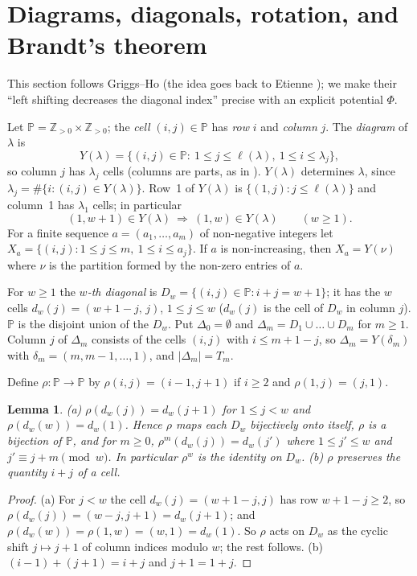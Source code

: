 \documentclass[11pt]{article}
\newtheorem{lemma}[theorem]{Lemma}
\theoremstyle{definition}
\newcommand{\Z}{\mathbb{Z}}
\newcommand{\PP}{\mathbb{P}}
\renewcommand{\le}{\leqslant}
\renewcommand{\ge}{\geqslant}
\begin{document}
\section{Diagrams, diagonals, rotation, and Brandt's theorem}\label{sec:brandt}

This section follows Griggs--Ho \cite[\S2]{GH} (the idea goes back to Etienne \cite{Et});
we make their ``left shifting decreases the diagonal index'' precise with an explicit
potential $\Phi$.

Let $\PP=\Z_{>0}\times\Z_{>0}$; the \emph{cell} $(i,j)\in\PP$ has \emph{row} $i$ and \emph{column} $j$.
The \emph{diagram} of $\lambda$ is
\[Y(\lambda)=\{(i,j)\in\PP:\ 1\le j\le\ell(\lambda),\ 1\le i\le\lambda_j\},\]
so column $j$ has $\lambda_j$ cells (columns are parts, as in \cite{GH}).
$Y(\lambda)$ determines $\lambda$, since $\lambda_j=\#\{i:(i,j)\in Y(\lambda)\}$.
Row~1 of $Y(\lambda)$ is $\{(1,j):j\le\ell(\lambda)\}$ and column~1 has $\lambda_1$ cells; in particular
\begin{equation}\label{eq:Y1}
(1,w+1)\in Y(\lambda)\ \Longrightarrow\ (1,w)\in Y(\lambda)\qquad(w\ge1).
\end{equation}
For a finite sequence $a=(a_1,\dots,a_m)$ of non-negative integers let
$X_a=\{(i,j):1\le j\le m,\ 1\le i\le a_j\}$.  If $a$ is non-increasing, then $X_a=Y(\nu)$ where $\nu$ is the
partition formed by the non-zero entries of $a$.

For $w\ge 1$ the \emph{$w$-th diagonal} is $D_w=\{(i,j)\in\PP: i+j=w+1\}$; it has the $w$ cells
$d_w(j)=(w+1-j,\,j)$, $1\le j\le w$ ($d_w(j)$ is the cell of $D_w$ in column $j$).
$\PP$ is the disjoint union of the $D_w$.  Put $\Delta_0=\emptyset$ and
$\Delta_m=D_1\cup\dots\cup D_m$ for $m\ge 1$.  Column $j$ of $\Delta_m$ consists of the cells $(i,j)$ with
$i\le m+1-j$, so $\Delta_m=Y(\delta_m)$ with $\delta_m=(m,m-1,\dots,1)$, and $|\Delta_m|=T_m$.

Define $\rho:\PP\to\PP$ by $\rho(i,j)=(i-1,j+1)$ if $i\ge2$ and $\rho(1,j)=(j,1)$.

\begin{lemma}\label{lem:rho}
(a) $\rho(d_w(j))=d_w(j+1)$ for $1\le j<w$ and $\rho(d_w(w))=d_w(1)$.  Hence $\rho$ maps each $D_w$
bijectively onto itself, $\rho$ is a bijection of $\PP$, and for $m\ge 0$,
$\rho^m(d_w(j))=d_w(j')$ where $1\le j'\le w$ and $j'\equiv j+m\pmod w$.  In particular $\rho^w$ is the
identity on $D_w$.
(b) $\rho$ preserves the quantity $i+j$ of a cell.
\end{lemma}
\begin{proof}
(a) For $j<w$ the cell $d_w(j)=(w+1-j,j)$ has row $w+1-j\ge2$, so $\rho(d_w(j))=(w-j,j+1)=d_w(j+1)$;
and $\rho(d_w(w))=\rho(1,w)=(w,1)=d_w(1)$.  So $\rho$ acts on $D_w$ as the cyclic shift $j\mapsto j+1$
of column indices modulo $w$; the rest follows.  (b) $(i-1)+(j+1)=i+j$ and $j+1=1+j$.
\end{proof}
\end{document}
